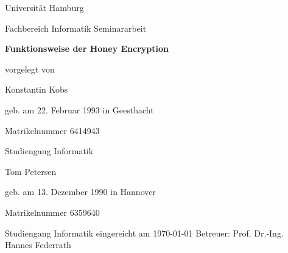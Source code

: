 \documentclass[12pt]{scrartcl}
\begin{document}
\newpage

\thispagestyle{empty}
\begin{center}\Large
Universität Hamburg \par
Fachbereich Informatik
\vfill
Seminararbeit
\vfill
{\Large\textsf{\textbf{Funktionsweise der Honey Encryption}}\par}
\vfill
vorgelegt von 
\par\bigskip
Konstantin Kobs \par
geb. am 22. Februar 1993 in Geesthacht \par
Matrikelnummer 6414943 \par
Studiengang Informatik
\par\bigskip
Tom Petersen \par
geb. am 13. Dezember 1990 in Hannover \par
Matrikelnummer 6359640 \par
Studiengang Informatik
\vfill
eingereicht am \today
\vfill 
Betreuer: Prof. Dr.-Ing. Hannes Federrath \par
\end{center}

\newpage

\tableofcontents
\newpage


\newpage


\newpage


\newpage


\newpage


\newpage


\newpage

\begingroup
\let\itshape\upshape


\endgroup
\end{document}
